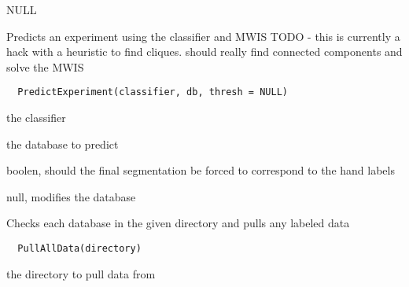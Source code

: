 \documentclass[a4paper]{book}
\begin{document}
%
\begin{Value}
NULL
\end{Value}
%
\begin{Description}\relax
Predicts an experiment using the classifier and MWIS TODO
- this is currently a hack with a heuristic to find
cliques.  should really find connected components and
solve the MWIS
\end{Description}
%
\begin{Usage}
\begin{verbatim}
  PredictExperiment(classifier, db, thresh = NULL)
\end{verbatim}
\end{Usage}
%
\begin{Arguments}
\begin{ldescription}
\item[\code{classifier}] the classifier

\item[\code{dn}] the database to predict

\item[\code{enforcelabels}] boolen, should the final
segmentation be forced to correspond to the hand labels
\end{ldescription}
\end{Arguments}
%
\begin{Value}
null, modifies the database
\end{Value}
%
\begin{Description}\relax
Checks each database in the given directory and pulls any
labeled data
\end{Description}
%
\begin{Usage}
\begin{verbatim}
  PullAllData(directory)
\end{verbatim}
\end{Usage}
%
\begin{Arguments}
\begin{ldescription}
\item[\code{directory}] the directory to pull data from
\end{ldescription}
\end{Arguments}
\end{document}
